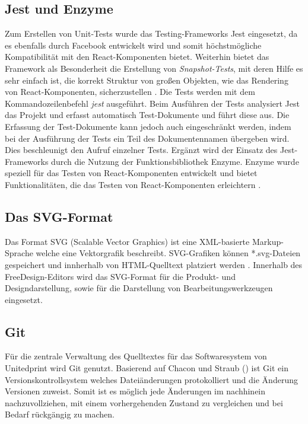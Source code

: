 \subsection{Jest und Enzyme}
Zum Erstellen von Unit-Tests wurde das Testing-Frameworks Jest eingesetzt, da es ebenfalls durch Facebook entwickelt wird und somit höchstmögliche Kompatibilität mit den React-Komponenten bietet. Weiterhin bietet das Framework als Besonderheit die Erstellung von \emph{Snapshot-Tests}, mit deren Hilfe es sehr einfach ist, die korrekt Struktur von großen Objekten, wie das Rendering von React-Komponenten, sicherzustellen \autocite[vgl.][]{Facebook:JestIntroduction}.
Die Tests werden mit dem Kommandozeilenbefehl \emph{jest} ausgeführt.
Beim Ausführen der Tests analysiert Jest das Projekt und erfasst automatisch Test-Dokumente und führt diese aus. 
Die Erfassung der Test-Dokumente kann jedoch auch eingeschränkt werden, indem bei der Ausführung der Tests ein Teil des Dokumentennamen übergeben wird. Dies beschleunigt den Aufruf einzelner Tests. 
Ergänzt wird der Einsatz des Jest-Frameworks durch die Nutzung der Funktionsbibliothek Enzyme. Enzyme wurde speziell für das Testen von React-Komponenten entwickelt und bietet Funktionalitäten, die das Testen von React-Komponenten erleichtern \autocite[vgl.][]{Enzyme:Introduction}.

\subsection{Das SVG-Format}
Das Format SVG (Scalable Vector Graphics) ist eine XML-basierte Markup-Sprache welche eine Vektorgrafik beschreibt. SVG-Grafiken können *.svg-Dateien gespeichert und innherhalb von HTML-Quelltext platziert werden \autocite[vgl.][]{AboutSVG}. Innerhalb des FreeDesign-Editors wird das SVG-Format für die Produkt- und Designdarstellung, sowie für die Darstellung von Bearbeitungswerkzeugen eingesetzt. 

\subsection{Git}
\label{chap:git}
Für die zentrale Verwaltung des Quelltextes für das Softwaresystem von Unitedprint wird Git genutzt. 
Basierend auf Chacon und Straub (\citeyear{Git:About}) ist Git ein Versionskontrollsystem welches Dateiänderungen protokolliert und die Änderung Versionen zuweist. Somit ist es möglich jede Änderungen im nachhinein nachzuvollziehen, mit einem vorhergehenden Zustand zu vergleichen und bei Bedarf rückgängig zu machen.

